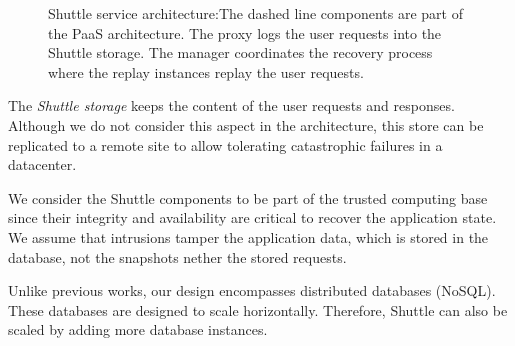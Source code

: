 \begin{figure}[]
\centering
{}

\caption{Shuttle service architecture:The dashed line components are part of the \ac{PaaS} architecture. The proxy logs the user requests into the Shuttle storage. The manager coordinates the recovery process where the replay instances replay the user requests.}
\label{fig:shuttle_architecture}
\end{figure}
  

The \emph{Shuttle storage} keeps the content of the user requests and responses. Although we do not consider this aspect in the architecture, this store can be replicated to a remote site to allow tolerating catastrophic failures in a datacenter.


We consider the Shuttle components to be part of the trusted computing base since their integrity and availability are critical to recover the application state. We assume that intrusions tamper the application data, which is stored in the database, not the snapshots nether the stored requests. 

Unlike previous works, our design encompasses distributed databases (\acs{NoSQL}). These databases are designed to scale horizontally. Therefore, Shuttle can also be scaled by adding more database instances.

